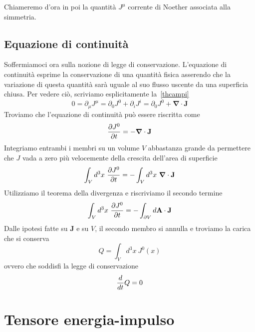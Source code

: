     Chiameremo d'ora in poi la quantità $J^\mu$ corrente di Noether associata alla simmetria. 

\subsection{Equazione di continuità}
    Soffermiamoci ora sulla nozione di legge di conservazione. L'equazione di continuità esprime la conservazione di una quantità fisica asserendo che la variazione di questa quantità sarà uguale al suo flusso uscente da una superficia chiusa. Per vedere ciò, scriviamo esplicitamente la~\eqref{thcampi}
    \begin{equation*}
        0 = \partial_\mu J^\mu = \partial_0 J^0 + \partial_i J^i = \partial_0 J^0 + \boldsymbol \nabla \cdot \mathbf J
    \end{equation*}
    Troviamo che l'equazione di continuità può essere riscritta come 
    \begin{equation*}
        \frac{\partial J^0}{\partial t} = - \boldsymbol \nabla \cdot \mathbf J
    \end{equation*}
    Integriamo entrambi i membri su un volume $V$ abbastanza grande da permettere che $J$ vada a zero più velocemente della crescita dell'area di superficie
    \begin{equation*}
        \int_V d^3 x ~ \frac{\partial J^0}{\partial t} = - \int_V d^3 x ~ \boldsymbol  \nabla \cdot \mathbf J
    \end{equation*} 
    Utilizziamo il teorema della divergenza e riscriviamo il secondo termine 
    \begin{equation*}
        \int_V d^3 x ~\frac{\partial J^0}{\partial t} = - \int_{\partial V} d \mathbf A \cdot \mathbf J
    \end{equation*} 
    Dalle ipotesi fatte su $\mathbf J$ e su $V$, il secondo membro si annulla e troviamo la carica che si conserva 
    \begin{equation*}
        Q = \int_V d^3 x ~ J^0(x)
    \end{equation*} 
    ovvero che soddisfi la legge di conservazione
    \begin{equation*}
        \frac{d}{dt} Q = 0 
    \end{equation*}

\section{Tensore energia-impulso}

